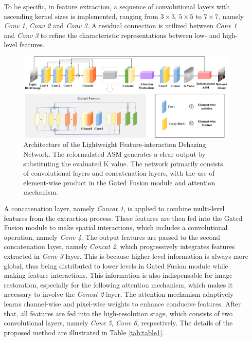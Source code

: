 \documentclass[lettersize,journal]{IEEEtran}
\begin{document}
To be specific, in feature extraction, a sequence of convolutional layers with ascending kernel sizes is implemented, ranging from $3 \times 3$, $5 \times 5$ to $7 \times 7$, namely \textit{Conv 1}, \textit{Conv 2} and \textit{Conv 3}. A residual connection is utilized between \textit{Conv 1} and \textit{Conv 3} to refine the characteristic representations between low- and high-level features.

\begin{figure}[t]
    \centering
    \includegraphics[width=\textwidth]{figure1_x.jpg}
    \caption{Architecture of the Lightweight Feature-interaction Dehazing Network. The reformulated ASM generates a clear output by substituting the evaluated K value. The network primarily consists of convolutional layers and concatenation layers, with the use of element-wise product in the Gated Fusion module and attention mechanism.}
    \label{LFD-Net}
\end{figure}

A concatenation layer, namely \textit{Concat 1}, is applied to combine multi-level features from the extraction process. These features are then fed into the Gated Fusion module to make spatial interactions, which includes a convolutional operation, namely \textit{Conv 4}. The output features are passed to the second concatenation layer, namely \textit{Concat 2}, which progressively integrates features extracted in \textit{Conv 3} layer. This is because higher-level information is always more global, thus being distributed to lower levels in Gated Fusion module while making feature interactions. This information is also indispensable for image restoration, especially for the following attention mechanism, which makes it necessary to involve the \textit{Concat 2} layer. The attention mechanism adaptively learns channel-wise and pixel-wise weights to enhance conducive features. After that, all features are fed into the high-resolution stage, which consists of two convolutional layers, namely \textit{Conv 5}, \textit{Conv 6}, respectively. The details of the proposed method are illustrated in Table \ref{tab:table1}.
\end{document}

